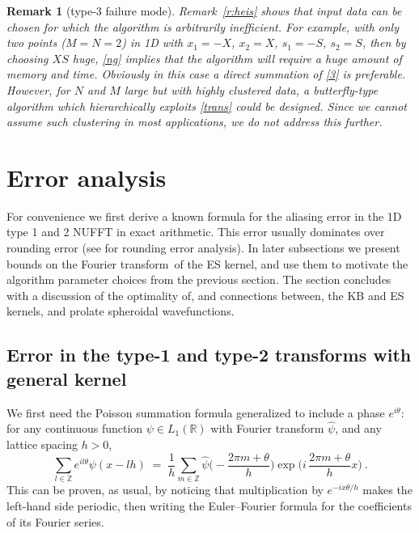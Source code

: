 \documentclass[10pt]{article}
\newcommand{\be}{\begin{equation}}
\newcommand{\ee}{\end{equation}}
\newcommand{\RR}{\mathbb{R}}
\newcommand{\ZZ}{\mathbb{Z}}
\newtheorem{rmk}[thm]{Remark}
\newcommand{\FT}{Fourier transform}
\begin{document}
\begin{rmk}[type-3 failure mode]
  Remark~\ref{r:heis} shows that input data can be chosen for which the
  algorithm is arbitrarily inefficient.
  For example, with only two points ($M=N=2$) in 1D with
  $x_1=-X$, $x_2=X$, $s_1=-S$, $s_2=S$,
  then by choosing $XS$ huge, \eqref{ng} implies that the algorithm
  will require a huge amount of memory and time.
  Obviously in this case a direct summation of \eqref{3} is preferable.
  However, for $N$ and $M$ large but with highly clustered data,
  a butterfly-type algorithm which hierarchically exploits \eqref{trans}
  could be designed. Since we cannot assume such clustering in most
  applications, we do not address this further.
\end{rmk}




\section{Error analysis}

For convenience we first derive a known formula
for the aliasing error in the 1D type 1 and 2 NUFFT
in exact arithmetic.
This error usually dominates over rounding error
(see \cite[\S 1.4]{nfftchap} for rounding error analysis).
In later subsections we present bounds on the \FT\ of the ES kernel,
and use them to motivate the algorithm parameter choices from the
previous section.
The section concludes with a discussion of the optimality of,
and connections between, the KB and ES kernels, and prolate spheroidal
wavefunctions.

\subsection{Error in the type-1 and type-2 transforms with general kernel}
\label{s:err}

We first need the
Poisson summation formula
\cite{apostol} generalized to include a phase $e^{i\theta}$:
for any continuous function
$\psi \in L_1(\RR)$ with Fourier transform $\hat\psi$,
and any lattice spacing $h>0$,
\be
\sum_{l\in\ZZ} e^{il\theta} \psi(x - lh) \; = \;
\frac{1}{h} \sum_{m\in\ZZ}
\hat\psi\biggl(-\frac{2\pi m + \theta}{h}\biggr)
\exp \biggl({i\,\frac{2\pi m + \theta}{h}x}\biggr)
~.
\label{pois}
\ee
This can be proven, as usual, by noticing that multiplication
by $e^{-ix\theta/h}$ makes the left-hand side periodic,
then writing the Euler--Fourier formula for the coefficients of its
Fourier series.
\end{document}
